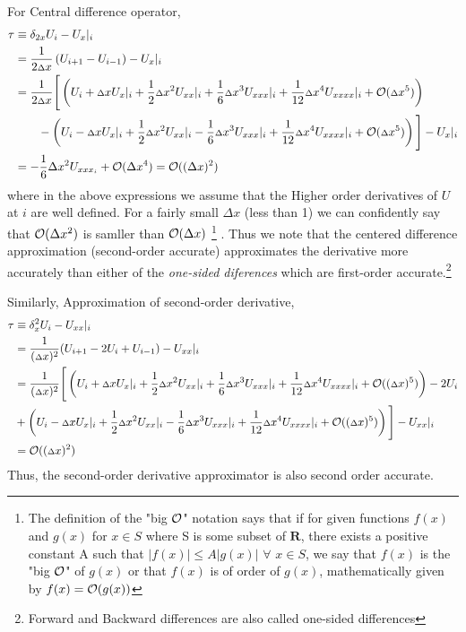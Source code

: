 For Central difference operator,
\begin{align*}
    \tau &\equiv \delta _ {2x} U_ i - {U_ x}|_ i \\
    &= \frac{1}{{2 {\scriptstyle \Delta} } x}\left( U_ {i+1} - U_{i-1}\right) - {U_ x}|_i \\
    &= \frac{1}{2 {\scriptstyle \Delta}  x}\Bigg[ \left( U_ i + {\scriptstyle \Delta} x{U_ x}|_ i + \frac{1}{2}{\scriptstyle \Delta} x^2{U_{xx}}|_ i + \frac{1}{6}{\scriptstyle \Delta} x^3{U_{xxx}}|_ i + \frac{1}{12}{\scriptstyle \Delta} x^4{U_{xxxx}}|_ i + \mathcal{O}({\scriptstyle \Delta} x^5)\right) \\
    &\qquad - \left( U_ i - {\scriptstyle \Delta} x{U_ x}|_ i + \frac{1}{2}{\scriptstyle \Delta} x^2{U_{xx}}|_ i - \frac{1}{6}{\scriptstyle \Delta} x^3{U_{xxx}}|_ i + \frac{1}{12}{\scriptstyle \Delta} x^4{U_{xxxx}}|_ i +\mathcal{O}({\scriptstyle \Delta} x^5)\right)\Bigg] - {U_ x}|_ i \\
    &= -\frac{1}{6}\Delta x^2 U_{xxx_ i} + \mathcal{O}(\Delta x^4) = \mathcal{O}((\Delta x)^2)
\end{align*}
where in the above expressions we assume that the Higher order derivatives of $U$ at $i$ are well defined. For a fairly small $\Delta x$ (less than 1) we can confidently say that $\mathcal{O}(\Delta x^2)$ is samller than $\mathcal{O}(\Delta x)$%
\footnote{The definition of the "big $\mathcal{O}$" notation says that if for given functions $f(x)$ and $g(x)$ for $x \in S$ where S is some subset of $\mathbf{R}$, there exists a positive constant A such that $|f(x)| \leq A|g(x)|$ $\forall$ $x \in S$, we say that $f(x)$ is the "big $\mathcal{O}$" of $g(x)$ or that $f(x)$ is of order of $g(x)$, mathematically given by $f(x) = \mathcal{O}(g(x))$}%
. Thus we note that the centered difference approximation (second-order accurate) approximates the derivative more accurately than either of the \textit{one-sided diferences} which are first-order accurate.\footnote{Forward and Backward differences are also called one-sided differences}

Similarly, Approximation of second-order derivative,
\begin{align*}
    \tau &\equiv \delta^2_x U_i - U_{xx}|_i \\
     &= \frac{1}{({\scriptstyle \Delta} x)^2}(U_{i+1}-2 U_i + U_{i-1})  - U_{xx}|_i \\
     &= \frac{1}{({\scriptstyle \Delta} x)^2}\Bigg[ \left( U_ i + {\scriptstyle \Delta} x{U_ x}|_ i + \frac{1}{2}{\scriptstyle \Delta} x^2{U_{xx}}|_ i + \frac{1}{6}{\scriptstyle \Delta} x^3{U_{xxx}}|_ i + \frac{1}{12}{\scriptstyle \Delta} x^4{U_{xxxx}}|_ i + \mathcal{O}(({\scriptstyle \Delta} x)^5)\right) - 2 U_i\\
    & + \left( U_ i - {\scriptstyle \Delta} x{U_ x}|_ i + \frac{1}{2}{\scriptstyle \Delta} x^2{U_{xx}}|_ i - \frac{1}{6}{\scriptstyle \Delta} x^3{U_{xxx}}|_ i + \frac{1}{12}{\scriptstyle \Delta} x^4{U_{xxxx}}|_ i +\mathcal{O}(({\scriptstyle \Delta} x)^5)\right)\Bigg] - {U_ {xx}}|_ i \\
    &= \mathcal{O}(({\scriptstyle \Delta} x)^2)
\end{align*}
Thus, the second-order derivative approximator is also second order accurate.

